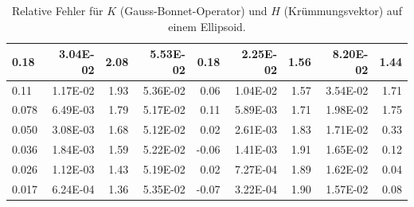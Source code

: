 \begin{table}[htbp]
\begin{tabular}{|l|r|r|r|r|r|r|r|r|}
            0.18 & 3.04E-02 & 2.08 & 5.53E-02 & 0.18 & 2.25E-02 & 1.56 & 8.20E-02 & 1.44 \\ \hline
            0.11 & 1.17E-02 & 1.93 & 5.36E-02 & 0.06 & 1.04E-02 & 1.57 & 3.54E-02 & 1.71 \\ \hline
            0.078 & 6.49E-03 & 1.79 & 5.17E-02 & 0.11 & 5.89E-03 & 1.71 & 1.98E-02 & 1.75 \\ \hline
            0.050 & 3.08E-03 & 1.68 & 5.12E-02 & 0.02 & 2.61E-03 & 1.83 & 1.71E-02 & 0.33 \\ \hline
            0.036 & 1.84E-03 & 1.59 & 5.22E-02 & -0.06 & 1.41E-03 & 1.91 & 1.65E-02 & 0.12 \\ \hline
            0.026 & 1.12E-03 & 1.43 & 5.19E-02 & 0.02 & 7.27E-04 & 1.89 & 1.62E-02 & 0.04 \\ \hline
            0.017 & 6.24E-04 & 1.36 & 5.35E-02 & -0.07 & 3.22E-04 & 1.90 & 1.57E-02 & 0.08 \\ \hline
      \end{tabular}
      \caption[Gauß-Bonnet und Krümmungsvektor auf einem Ellipsoid]{Relative Fehler für \( K \) (Gauss-Bonnet-Operator) und \( H \)
      (Krümmungsvektor) auf einem Ellipsoid.}
      \label{tabHeineCGBLX}
   \end{table}
  


